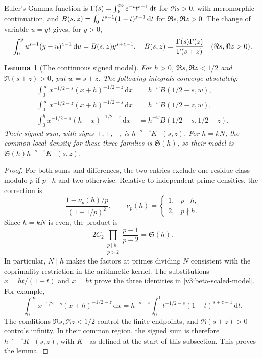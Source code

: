 \documentclass[12pt,a4paper]{amsart}
\numberwithin{equation}{section}
\def\d{\,{\rm d}}
\theoremstyle{plain}
\newtheorem{lemma}[proposition]{Lemma}
\theoremstyle{definition}
\theoremstyle{remark}
\begin{document}
Euler's Gamma function is
$\Gamma(s)=\int_0^\infty e^{-t}t^{s-1}\d t$ for $\Re s>0$,
with meromorphic continuation, and
$B(s,z)=\int_0^1t^{s-1}(1-t)^{z-1}\d t$ for $\Re s,\Re z>0$.
The change of variable $u=yt$ gives, for $y>0$,
\begin{equation}\label{v3i:Euler}
 \int_0^y u^{s-1}(y-u)^{z-1}\d u
 =B(s,z)y^{s+z-1},\quad
 B(s,z)=\frac{\Gamma(s)\Gamma(z)}{\Gamma(s+z)}
 \quad(\Re s,\Re z>0).
\end{equation}

\begin{lemma}[The continuous signed model]\label{proof:v9:signed-beta-model}
For $h>0$, $\Re s,\Re z<1/2$ and $\Re(s+z)>0$, put $w=s+z$.
The following integrals converge absolutely:
\begin{equation}\label{v3:beta-scaled-model}
 \begin{aligned}
 \int_0^\infty x^{-1/2-s}(x+h)^{-1/2-z}\,\mathrm{d}x
    &=h^{-w}B(1/2-s,w),\\
 \int_0^\infty x^{-1/2-z}(x+h)^{-1/2-s}\,\mathrm{d}x
    &=h^{-w}B(1/2-z,w),\\
 \int_0^h x^{-1/2-s}(h-x)^{-1/2-z}\,\mathrm{d}x
    &=h^{-w}B(1/2-s,1/2-z).
 \end{aligned}
\end{equation}
Their signed sum, with signs $+,+,-$, is $h^{-s-z}K_-(s,z)$.
For $h=kN$, the common local density for these three families is
$\mathfrak S(h)$, so their model is
$\mathfrak S(h)h^{-s-z}K_-(s,z)$.
\end{lemma}

\begin{proof}
For both sums and differences, the two entries exclude one
residue class modulo $p$ if $p\mid h$ and two otherwise.
Relative to independent prime densities, the correction is
\[
 \frac{1-\nu_p(h)/p}{(1-1/p)^2},\qquad
 \nu_p(h)=\begin{cases}1,&p\mid h,\\2,&p\nmid h.\end{cases}
\]
Since $h=kN$ is even, the product is
\[
 2C_2\prod_{\substack{p\mid h\\p>2}}\frac{p-1}{p-2}
 =\mathfrak S(h).
\]
In particular, $N\mid h$ makes the factors at primes dividing $N$
consistent with the coprimality restriction in the arithmetic kernel.
The substitutions $x=ht/(1-t)$ and $x=ht$ prove the three
identities in \eqref{v3:beta-scaled-model}. For example,
\[
 \int_0^\infty x^{-1/2-s}(x+h)^{-1/2-z}\,\mathrm{d}x
 =h^{-s-z}\int_0^1t^{-1/2-s}(1-t)^{s+z-1}\,\mathrm{d}t.
\]
The conditions $\Re s,\Re z<1/2$ control the finite endpoints,
and $\Re(s+z)>0$ controls infinity. In their common region,
the signed sum is therefore $h^{-s-z}K_-(s,z)$, with
$K_-$ as defined at the start of this subsection.
This proves the lemma.
\end{proof}
\end{document}

